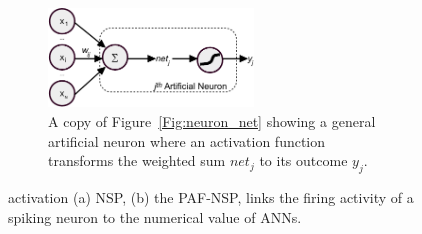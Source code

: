 \begin{figure}[tbh!]
\begin{subfigure}[t]{\textwidth}
		\end{subfigure}\\\bigskip\DIFaddbeginFL \bigskip
		\DIFaddendFL \begin{subfigure}[t]{\textwidth}
			\centering
			\DIFdelbeginFL %
\DIFdelendFL \DIFaddbeginFL \includegraphics[width=0.6\textwidth]{pics_iconip/neuron.pdf}
			\bigskip
			\DIFaddendFL \caption{A copy of Figure~\ref{Fig:neuron_net} showing a general artificial neuron where an activation function transforms the weighted sum $net_j$  to its outcome $y_j$.}
		\end{subfigure}
		\DIFdelbeginFL %
\DIFdelendFL \DIFaddbeginFL \caption[PAF models spiking neuron as an conventional activation function.]{\DIFaddendFL activation \DIFdelbeginFL {}\DIFdelendFL \DIFaddbeginFL {}\DIFaddendFL (a) \DIFdelbeginFL {}\DIFdelendFL \DIFaddbeginFL {}\DIFaddendFL NSP, \DIFaddbeginFL {}\DIFaddendFL (b) the PAF-NSP, \DIFdelbeginFL {}\DIFdelendFL \DIFaddbeginFL {}\DIFaddendFL links the firing activity of a spiking neuron to the numerical value of ANNs.
		\DIFaddbeginFL {}\DIFaddendFL }
		\label{Fig:tneuron}
	\end{figure}

	
	
